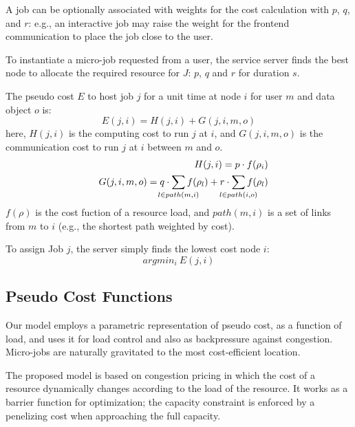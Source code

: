 A job can be optionally associated with weights for the cost
calculation with $p$, $q$, and $r$: e.g., an interactive job may raise
the weight for the frontend communication to place the job close to
the user.

To instantiate a micro-job requested from a user, the service
server finds the best node to allocate the required resource
for $J$: $p$, $q$ and $r$ for duration $s$.

The pseudo cost $E$ to host job $j$ for a unit time at node $i$ for
user $m$ and data object $o$ is:
\begin{equation*}
	E(j, i)     = H(j,i) + G(j,i,m,o)
\end{equation*}
here, $H(j, i)$ is the computing cost to run $j$ at $i$, and
$G(j, i, m, o)$ is the communication cost to run $j$ at $i$
between $m$ and $o$.
\begin{eqnarray*}
&&  H(j,i)      = p \cdot f(\rho_{i}) \\
&&  G(j,i,m,o)  = q \cdot \smashoperator{\sum_{l \in path(m,i)}} f(\rho_{l}) + r \cdot \smashoperator{\sum_{l \in path(i,o)}} f(\rho_{l})
\end{eqnarray*}
$f(\rho)$ is the cost fuction of a resource load, and $path(m,i)$ is a set
of links from $m$ to $i$ (e.g., the shortest path weighted by cost).

To assign Job $j$, the server simply finds the lowest cost node $i$:
\begin{equation*}
	argmin_{i} \: E(j, i)
\end{equation*}

\subsection{Pseudo Cost Functions}


Our model employs a parametric representation of pseudo cost, as a
function of load, and uses it for load control and also as
backpressure against congestion.
Micro-jobs are naturally gravitated to the most cost-efficient
location.

The proposed model is based on congestion pricing in which the cost of
a resource dynamically changes according to the load of the resource.
It works as a barrier function for optimization; the capacity
constraint is enforced by a penelizing cost when approaching the full
capacity.

